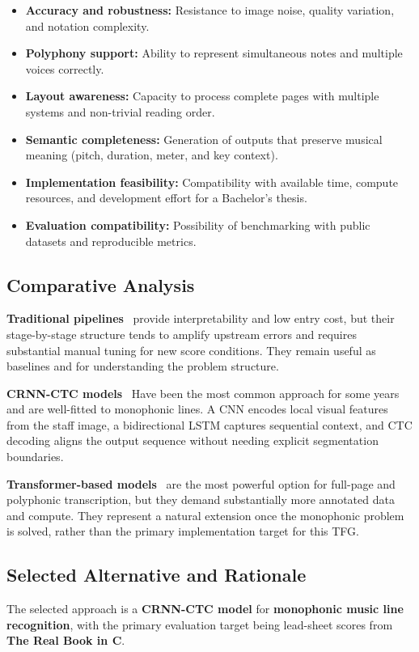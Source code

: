 \documentclass[11pt, a4paper]{article}
\begin{document}
\begin{itemize}
    \item \textbf{Accuracy and robustness:} Resistance to image noise, quality variation, and notation complexity.
    \item \textbf{Polyphony support:} Ability to represent simultaneous notes and multiple voices correctly.
    \item \textbf{Layout awareness:} Capacity to process complete pages with multiple systems and non-trivial reading order.
    \item \textbf{Semantic completeness:} Generation of outputs that preserve musical meaning (pitch, duration, meter, and key context).
    \item \textbf{Implementation feasibility:} Compatibility with available time, compute resources, and development effort for a Bachelor's thesis.
    \item \textbf{Evaluation compatibility:} Possibility of benchmarking with public datasets and reproducible metrics.
\end{itemize}

\subsection{Comparative Analysis}
\textbf{Traditional pipelines}~\cite{dalitzComparativeStudyStaff2008} provide interpretability and low entry cost, but their stage-by-stage structure tends to amplify upstream errors and requires substantial manual tuning for new score conditions. They remain useful as baselines and for understanding the problem structure.

\noindent\textbf{CRNN-CTC models}~\cite{PrIMuSDataset,opticalmusicrecognitionresearchSelfLearningOpticalMusic2019} Have been the most common approach for some years and are well-fitted to monophonic lines. A CNN encodes local visual features from the staff image, a bidirectional LSTM captures sequential context, and CTC decoding aligns the output sequence without needing explicit segmentation boundaries. 

\noindent\textbf{Transformer-based models}~\cite{vilaAntoniorv6SMT2026,UfalOlimpicicdar24Practical} are the most powerful option for full-page and polyphonic transcription, but they demand substantially more annotated data and compute. They represent a natural extension once the monophonic problem is solved, rather than the primary implementation target for this TFG.

\subsection{Selected Alternative and Rationale}
The selected approach is a \textbf{CRNN-CTC model} for \textbf{monophonic music line recognition}, with the primary evaluation target being lead-sheet scores from \textbf{The Real Book in C}.
\end{document}
